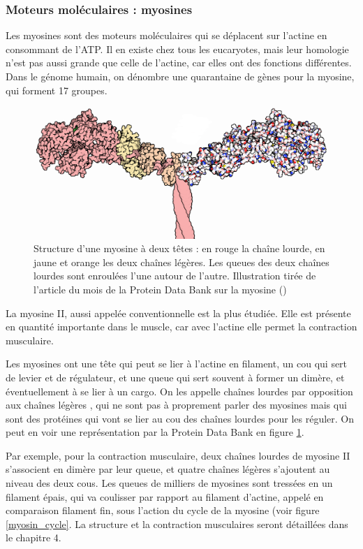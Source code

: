 \documentclass{report}
\begin{document}
\subsubsection{Moteurs moléculaires : myosines}

Les myosines sont des moteurs moléculaires qui se déplacent sur l'actine en consommant de l'ATP. Il en existe chez tous les eucaryotes, mais leur homologie n'est pas aussi grande que celle de l'actine, car elles ont des fonctions différentes. Dans le génome humain, on dénombre une quarantaine de gènes pour la myosine, qui forment 17 groupes.

\begin{figure}
\includegraphics[scale=3]{Figures/18-Myosin-1b7t.png} 
\caption{Structure d'une myosine à deux têtes : en rouge la chaîne lourde, en jaune et orange les deux chaînes légères. Les queues des deux chaînes lourdes sont enroulées l'une autour de l'autre. Illustration tirée de l'article du mois de la Protein Data Bank sur la myosine (\cite{goodsell_molecule_2010}) \label{myosin}}
\end{figure}

La myosine II, aussi appelée \og conventionnelle \fg est la plus étudiée. Elle est présente en quantité importante dans le muscle, car avec l'actine elle permet la contraction musculaire. 

Les myosines ont une tête qui peut se lier à l'actine en filament, un cou  qui sert de levier et de régulateur, et une queue qui sert souvent à former un dimère, et éventuellement à se lier à un cargo. On les appelle \og chaînes lourdes \fg par opposition aux \og chaînes légères \fg, qui ne sont pas à proprement parler des myosines mais qui sont des protéines qui vont se lier au cou des \og chaînes lourdes \fg pour les réguler. On peut en voir une représentation par la Protein Data Bank en figure \ref{myosin}.

Par exemple, pour la contraction musculaire, deux chaînes lourdes de myosine II s'associent en dimère par leur queue, et quatre chaînes légères s'ajoutent au niveau des deux cous. Les queues de milliers de myosines sont tressées en un filament épais, qui va coulisser par rapport au filament d'actine, appelé en comparaison filament fin, sous l'action du cycle de la myosine (voir figure \ref{myosin_cycle}. La structure et la contraction musculaires seront détaillées dans le chapitre 4. 
\end{document}
